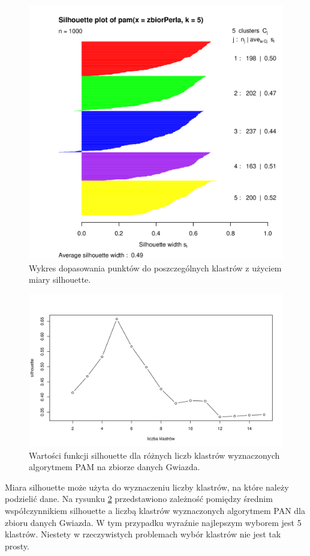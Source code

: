 \documentclass[polish,]{book}
\begin{document}
\begin{figure}

{\centering \includegraphics[width=0.7\linewidth]{silhouette} 

}

\caption{Wykres dopasowania punktów do poszczególnych klastrów z użyciem miary silhouette.}\label{fig:silhouette}
\end{figure}
\begin{figure}

{\centering \includegraphics[width=0.7\linewidth]{silhouetteB} 

}

\caption{Wartości funkcji silhouette dla różnych liczb klastrów wyznaczonych algorytmem PAM na zbiorze danych Gwiazda.}\label{fig:silhouetteB}
\end{figure}

Miara silhouette może użyta do wyznaczeniu liczby klastrów, na które należy
podzielić dane. Na rysunku \ref{fig:silhouetteB} przedstawiono zależność pomiędzy średnim współczynnikiem silhouette a liczbą klastrów wyznaczonych algorytmem PAN dla zbioru danych Gwiazda. W tym przypadku wyraźnie najlepszym wyborem jest 5 klastrów. Niestety w rzeczywistych problemach wybór klastrów nie jest tak prosty.
\end{document}

